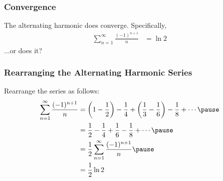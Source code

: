 \documentclass{beamer}
\begin{document}
\begin{frame}
  \frametitle{Convergence}
  The alternating harmonic does converge. Specifically,
  \begin{align*}
    \sum_{n=1}^{\infty}\frac{(-1)^{n+1}}{n} &= \ln 2
  \end{align*}\pause
  ...or does it? 
\end{frame}
\begin{frame}
  \frametitle{Rearranging the Alternating Harmonic Series}
  Rearrange the series as follows:
  \begin{align*}
    \sum_{n=1}^{\infty}\frac{(-1)^{n+1}}{n} &= \left(1-\frac{1}{2}\right) - \frac{1}{4} + \left(\frac{1}{3} - \frac{1}{6}\right) - \frac{1}{8} + \cdots\pause\\
                                            &= \frac{1}{2} - \frac{1}{4} + \frac{1}{6} - \frac{1}{8} + \cdots\pause\\
                                            &= \frac{1}{2}\sum_{n=1}^{\infty}\frac{(-1)^{n+1}}{n}\pause\\
                                            &= \frac{1}{2}\ln 2
  \end{align*}
\end{frame}
\end{document}
